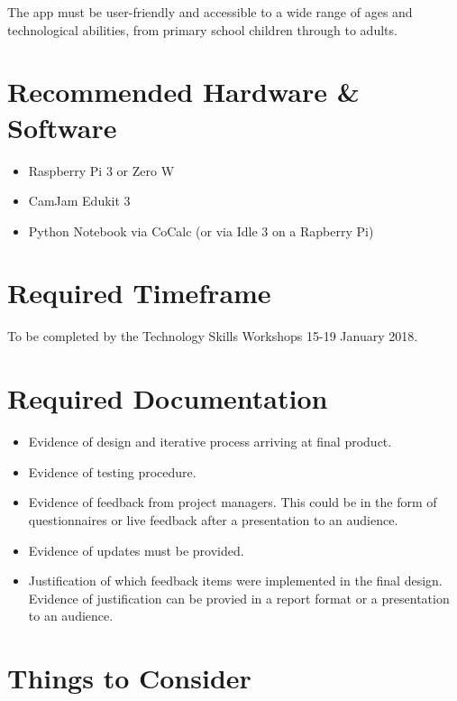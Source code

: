 \documentclass[10pt]{article}
\begin{document}
	The app must be user-friendly and accessible to a wide range of ages and technological abilities, from primary school children through to adults. 
	
	\section{Recommended Hardware \& Software}
	
	\begin{itemize}
		\item Raspberry Pi 3 or Zero W
		\item CamJam Edukit 3
		\item Python Notebook via CoCalc (or via Idle 3 on a Rapberry Pi)
	\end{itemize}
	
	\section{Required Timeframe}
	
	To be completed by the Technology Skills Workshops 15-19 January 2018.
	
	\section{Required Documentation}
	
	\begin{itemize}
		\item Evidence of design and iterative process arriving at final product. 
		\item Evidence of testing procedure. 
		\item Evidence of feedback from project managers. This could be in the form of questionnaires or live feedback after a presentation to an audience.
		\item Evidence of updates must be provided. 
		\item Justification of which feedback items were implemented in the final design. Evidence of justification can be provied in a report format or a presentation to an audience. 
	\end{itemize}

	\section{Things to Consider}
	
\end{document}
